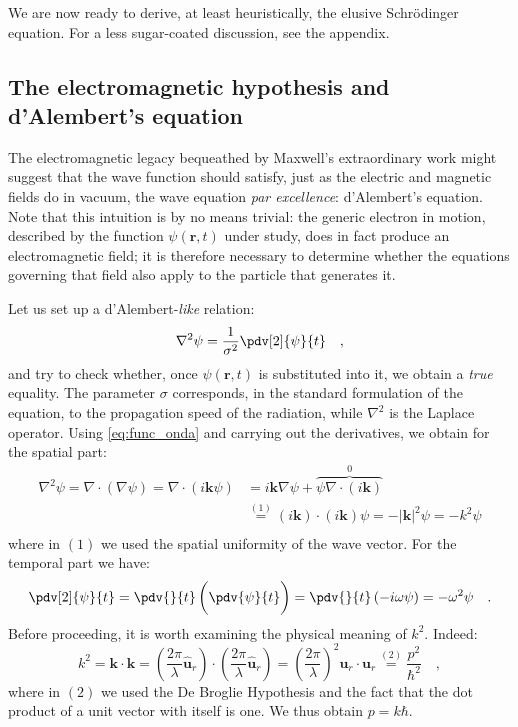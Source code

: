 We are now ready to derive, at least heuristically, the elusive Schrödinger equation. For a less sugar-coated discussion, see the appendix.

\subsection{The electromagnetic hypothesis and d'Alembert's equation}
The electromagnetic legacy bequeathed by Maxwell's extraordinary work might suggest that the wave function should satisfy, just as the electric and magnetic fields do in vacuum, the wave equation \emph{par excellence}: d'Alembert's equation. Note that this intuition is by no means trivial: the generic electron in motion, described by the function $\psi(\bm{r},t)$ under study, does in fact produce an electromagnetic field; it is therefore necessary to determine whether the equations governing that field also apply to the particle that generates it.

Let us set up a d'Alembert-\emph{like} relation:
\begin{equation}
    \nabla^2 \psi = \frac{1}{\sigma^2} \pdv[2]{\psi}{t} \quad,
    \label{eq:d'ale}
\end{equation}
and try to check whether, once $\psi(\bm{r},t)$ is substituted into it, we obtain a \emph{true} equality. The parameter $\sigma$ corresponds, in the standard formulation of the equation, to the propagation speed of the radiation, while $\nabla^2$ is the Laplace operator. Using \eqref{eq:func_onda} and carrying out the derivatives, we obtain for the spatial part:
\[
\begin{aligned}
    \nabla^2 \psi = \nabla \cdot (\nabla\psi) = \nabla \cdot (i\bm{k}\psi) &= i\bm{k}\nabla\psi + \overbrace{\psi\nabla \cdot (i\bm{k})}^{0} \\ &\overset{(1)}{=} (i\bm{k})\cdot(i\bm{k})\psi = -|\bm{k}|^2 \psi = -k^2 \psi\\
\end{aligned}
\]
where in $(1)$ we used the spatial uniformity of the wave vector.
For the temporal part we have:
\[
    \pdv[2]{\psi}{t} = \pdv{}{t} \, \bigg(\pdv{\psi}{t}\bigg) = \pdv{}{t}\,(-i\omega\psi) = -\omega^2\psi \quad.
\]
Before proceeding, it is worth examining the physical meaning of $k^2$. Indeed:
\[
    k^2 = \bm{k} \cdot \bm{k} = \left(\frac{2\pi}{\lambda} \bm{\hat{u}}_r\right) \cdot \left(\frac{2\pi}{\lambda} \bm{\hat{u}}_r\right) = \left(\frac{2\pi}{\lambda}\right)^2 \bm{u}_r \cdot \bm{u}_r \overset{(2)}{=} \frac{p^2}{\hbar^2}\quad,
\]
where in $(2)$ we used the De Broglie Hypothesis and the fact that the dot product of a unit vector with itself is one. We thus obtain $p = k\hbar$.

